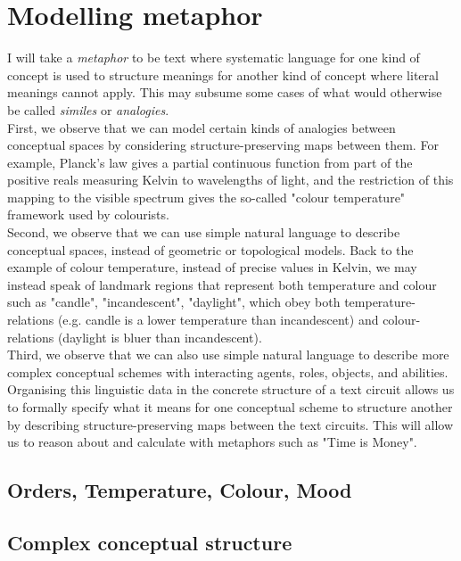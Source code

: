 \section{Modelling metaphor}

I will take a \emph{metaphor} to be text where systematic language for one kind of concept is used to structure meanings for another kind of concept where literal meanings cannot apply. This may subsume some cases of what would otherwise be called \emph{similes} or \emph{analogies}.\\

 First, we observe that we can model certain kinds of analogies between conceptual spaces by considering structure-preserving maps between them. For example, Planck's law gives a partial continuous function from part of the positive reals measuring Kelvin to wavelengths of light, and the restriction of this mapping to the visible spectrum gives the so-called "colour temperature" framework used by colourists.\\

Second, we observe that we can use simple natural language to describe conceptual spaces, instead of geometric or topological models. Back to the example of colour temperature, instead of precise values in Kelvin, we may instead speak of landmark regions that represent both temperature and colour such as "candle", "incandescent", "daylight", which obey both temperature-relations (e.g. candle is a lower temperature than incandescent) and colour-relations (daylight is bluer than incandescent).\\

Third, we observe that we can also use simple natural language to describe more complex conceptual schemes with interacting agents, roles, objects, and abilities. Organising this linguistic data in the concrete structure of a text circuit allows us to formally specify what it means for one conceptual scheme to structure another by describing structure-preserving maps between the text circuits. This will allow us to reason about and calculate with metaphors such as "Time is Money".


\subsection{Orders, Temperature, Colour, Mood}

\subsection{Complex conceptual structure}

